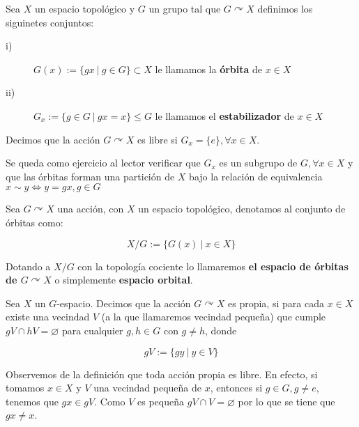 \begin{definition}

Sea $X$ un espacio topol\'ogico y $G$ un grupo tal que $G \curvearrowright X$ definimos los siguinetes conjuntos:

\begin{description}
\item[i)]$G(x):=\lbrace gx \: | \: g \in G \rbrace \subset X$ le llamamos la \textbf{\'orbita} de $x \in X$

\item[ii)]$G_x:=\lbrace g \in G  \: | \:  gx=x \rbrace \leq G $ le llamamos el \textbf{estabilizador} de $x \in X$\\
\end{description}

Decimos que la acci\'on $G \curvearrowright X$ es libre si $G_x=\lbrace e \rbrace, \forall x \in X$.\\

\end{definition}

Se queda como ejercicio al lector verificar que $G_x$ es un subgrupo de $G, \forall x \in X$ y que las \'orbitas forman una partici\'on de $X$ bajo la relaci\'on de equivalencia $x \sim y \Leftrightarrow y=gx, g \in G$


\begin{definition}

Sea $G \curvearrowright X$ una acci\'on, con $X$ un espacio topol\'ogico, denotamos al conjunto de \'orbitas como:

$$ X/G:=\lbrace G(x) \: | \: x \in X\rbrace $$

Dotando a $X/G$ con la topolog\'ia cociente lo llamaremos \textbf{el espacio de \'orbitas de $G \curvearrowright X$} o simplemente \textbf{espacio orbital}.

\end{definition}

\begin{definition}

Sea $X$ un $G$-espacio. Decimos que la acci\'on $G \curvearrowright X$ es propia, si para cada $x \in X$ existe una vecindad $V$ (a la que llamaremos vecindad peque\~na) que cumple $gV \cap hV= \varnothing$ para cualquier $g,h \in G$ con $g \neq h$, donde

$$gV:=\lbrace gy \: | \: y \in V\rbrace $$

\end{definition}

Observemos de la definici\'on que toda acci\'on propia es libre. En efecto, si tomamos $x \in X$ y $V$ una vecindad peque\~na de $x$, entonces si $g \in G, g\neq e$, tenemos que $gx \in gV$. Como $V$ es peque\~na $gV \cap V= \varnothing$ por lo que se tiene que $gx \neq x$.\\

